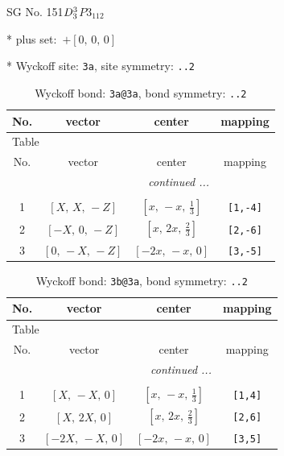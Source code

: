 \documentclass[fleqn,8pt]{jsarticle}
\begin{document}
\setcounter{MaxMatrixCols}{32}

\renewcommand{\tablename}{Table~}
\renewcommand{\figurename}{Figure~}
\begin{center}
\LARGE
SG No. 151\quad$D_{\rm 3}^{3}$\quad$P3_112$\quad[ trigonal ]
\end{center}

* plus set:\,\,\,$+\left[ 0,\, 0,\, 0 \right]$


* Wyckoff site: {\tt 3a}, site symmetry: {\tt ..2}
\renewcommand{\arraystretch}{1.2}
\begin{longtable}{cccc}
\caption{Wyckoff bond: {\tt 3a@3a}, bond symmetry: {\tt ..2}}
 \\
 \hline \hline
No. & vector & center & mapping \\ \hline \endfirsthead

\multicolumn{3}{l}{\tablename\ \thetable{}} \\
 \hline \hline
No. & vector & center & mapping \\ \hline \endhead

 \hline \hline
\multicolumn{3}{r}{\footnotesize\it continued ...} \\ \endfoot

 \hline \hline
\multicolumn{3}{r}{} \\ \endlastfoot

1 & $\left[ X,\, X,\, - Z \right]$ & $\left[ x,\, - x,\, \frac{1}{3} \right]$ & {\tt [1,-4]} \\ \hline
2 & $\left[ - X,\, 0,\, - Z \right]$ & $\left[ x,\, 2 x,\, \frac{2}{3} \right]$ & {\tt [2,-6]} \\ \hline
3 & $\left[ 0,\, - X,\, - Z \right]$ & $\left[ - 2 x,\, - x,\, 0 \right]$ & {\tt [3,-5]} \\
\end{longtable}
\renewcommand{\arraystretch}{1.2}
\begin{longtable}{cccc}
\caption{Wyckoff bond: {\tt 3b@3a}, bond symmetry: {\tt ..2}}
 \\
 \hline \hline
No. & vector & center & mapping \\ \hline \endfirsthead

\multicolumn{3}{l}{\tablename\ \thetable{}} \\
 \hline \hline
No. & vector & center & mapping \\ \hline \endhead

 \hline \hline
\multicolumn{3}{r}{\footnotesize\it continued ...} \\ \endfoot

 \hline \hline
\multicolumn{3}{r}{} \\ \endlastfoot

1 & $\left[ X,\, - X,\, 0 \right]$ & $\left[ x,\, - x,\, \frac{1}{3} \right]$ & {\tt [1,4]} \\ \hline
2 & $\left[ X,\, 2 X,\, 0 \right]$ & $\left[ x,\, 2 x,\, \frac{2}{3} \right]$ & {\tt [2,6]} \\ \hline
3 & $\left[ - 2 X,\, - X,\, 0 \right]$ & $\left[ - 2 x,\, - x,\, 0 \right]$ & {\tt [3,5]} \\
\end{longtable}
\end{document}
